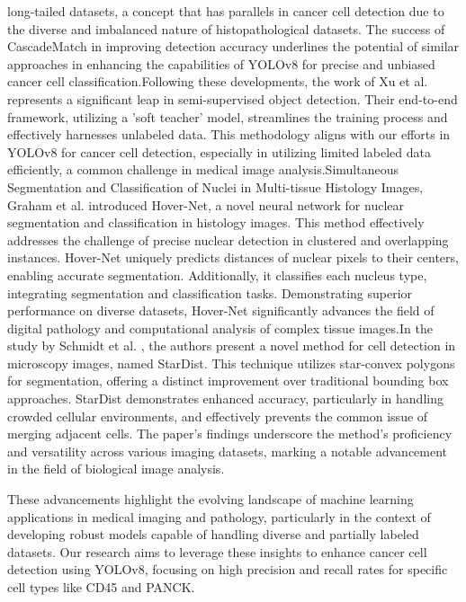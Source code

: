 \documentclass[anon]{midl} %
\begin{document}
long-tailed datasets, a concept that has parallels in cancer cell detection due to the diverse and imbalanced nature of histopathological datasets. The success of CascadeMatch in improving detection accuracy underlines the potential of similar approaches in enhancing the capabilities of YOLOv8 for precise and unbiased cancer cell classification.Following these developments, the work of Xu et al. \cite{xu2021end} represents a significant leap in semi-supervised object detection. Their end-to-end framework, utilizing a 'soft teacher' model, streamlines the training process and effectively harnesses unlabeled data. This methodology aligns with our efforts in YOLOv8 for cancer cell detection, especially in utilizing limited labeled data efficiently, a common challenge in medical image analysis.Simultaneous Segmentation and Classification of Nuclei in Multi-tissue Histology Images, Graham et al. \cite{graham2019hover} introduced Hover-Net, a novel neural network for nuclear segmentation and classification in histology images. This method effectively addresses the challenge of precise nuclear detection in clustered and overlapping instances. Hover-Net uniquely predicts distances of nuclear pixels to their centers, enabling accurate segmentation. Additionally, it classifies each nucleus type, integrating segmentation and classification tasks. Demonstrating superior performance on diverse datasets, Hover-Net significantly advances the field of digital pathology and computational analysis of complex tissue images.In the study by Schmidt et al. \cite{schmidt2018cell}, the authors present a novel method for cell detection in microscopy images, named StarDist. This technique utilizes star-convex polygons for segmentation, offering a distinct improvement over traditional bounding box approaches. StarDist demonstrates enhanced accuracy, particularly in handling crowded cellular environments, and effectively prevents the common issue of merging adjacent cells. The paper's findings underscore the method's proficiency and versatility across various imaging datasets, marking a notable advancement in the field of biological image analysis.






These advancements highlight the evolving landscape of machine learning applications in medical imaging and pathology, particularly in the context of developing robust models capable of handling diverse and partially labeled datasets. Our research aims to leverage these insights to enhance cancer cell detection using YOLOv8, focusing on high precision and recall rates for specific cell types like CD45 and PANCK.
\end{document}
